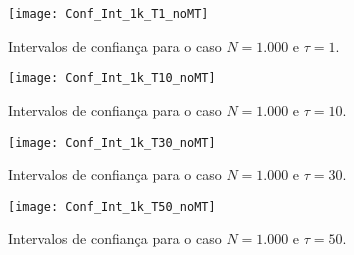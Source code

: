 \begin{figure}
	\centering
	\texttt{[image: Conf\_Int\_1k\_T1\_noMT]}
	\caption{Intervalos de confiança para o caso $N=1.000$ e $\tau=1$.}\label{Fig:Conf_Int_1k_T1}
\end{figure}

\begin{figure}
	\centering
	\texttt{[image: Conf\_Int\_1k\_T10\_noMT]}
	\caption{Intervalos de confiança para o caso $N=1.000$ e $\tau=10$.}\label{Fig:Conf_Int_1k_T10}
\end{figure}

\begin{figure}
	\centering
	\texttt{[image: Conf\_Int\_1k\_T30\_noMT]}
	\caption{Intervalos de confiança para o caso $N=1.000$ e $\tau=30$.}\label{Fig:Conf_Int_1k_30}
\end{figure}

\begin{figure}
	\centering
	\texttt{[image: Conf\_Int\_1k\_T50\_noMT]}
	\caption{Intervalos de confiança para o caso $N=1.000$ e $\tau=50$.}\label{Fig:Conf_Int_1k_T50}
\end{figure}


